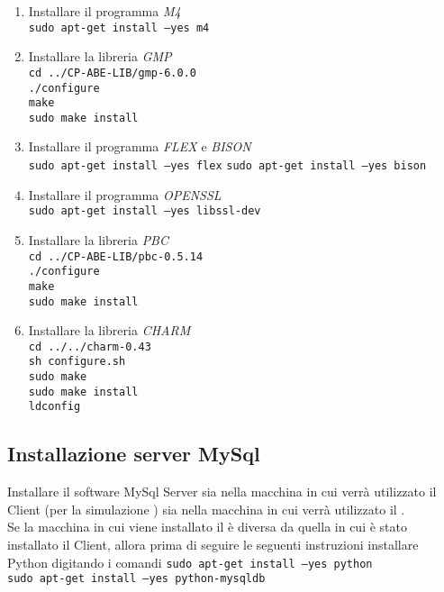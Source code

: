\documentclass[a4paper,twoside,10pt,openany]{scrbook}
\begin{document}
\begin{enumerate}
% 
\item Installare il programma \emph{M4}\\
      \texttt{sudo apt-get install --yes m4}
%
\item Installare la libreria \emph{GMP}\\
      \texttt{cd ../CP-ABE-LIB/gmp-6.0.0}\\
      \texttt{./configure}\\
      \texttt{make}\\
      \texttt{sudo make install}
% 
\item Installare il programma \emph{FLEX} e \emph{BISON}\\
      \texttt{sudo apt-get install --yes flex}
      \texttt{sudo apt-get install --yes bison}
% 
\item Installare il programma \emph{OPENSSL}\\
      \texttt{sudo apt-get install --yes libssl-dev}
% 
\item Installare la libreria \emph{PBC}\\
      \texttt{cd ../CP-ABE-LIB/pbc-0.5.14}\\
      \texttt{./configure}\\
      \texttt{make}\\
      \texttt{sudo make install}
% 
% 
% 
\item Installare la libreria \emph{CHARM}\\
      \texttt{cd ../../charm-0.43}\\
      \texttt{sh configure.sh}\\
      \texttt{sudo make}\\
      \texttt{sudo make install}\\
      \texttt{ldconfig}
% 
\end{enumerate}
%
\subsection{Installazione server MySql}\label{sec:installazione_mysql_ubu}
%
Installare il software MySql Server sia nella macchina in cui verrà utilizzato il Client (per la simulazione \auth) sia nella macchina in cui verrà utilizzato il \sr.\\
Se la macchina in cui viene installato il \sr è diversa da quella in cui è stato installato il Client, allora prima di seguire le seguenti instruzioni installare Python digitando i comandi
\texttt{sudo apt-get install --yes python}\\
\texttt{sudo apt-get install --yes python-mysqldb}\\
\end{document}
